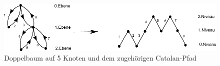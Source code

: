 \documentclass[a4paper, 11pt]{scrreprt}
\begin{document}

\begin{figure}[htpb]
	\centering
	\includegraphics[width=1.00\textwidth]{Catalan-Pfad.pdf}
	\caption{Doppelbaum auf 5 Knoten und dem zugehörigen Catalan-Pfad} 
\end{figure}
\end{document}
